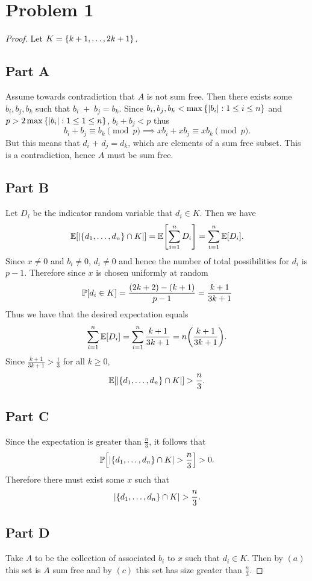 \documentclass{eeleyes}
\begin{document}
\section*{Problem 1}
\begin{proof}
    Let $K = \qty{k+1, \ldots, 2k+1}$.

    \subsection*{Part A}
    Assume towards contradiction that $A$ is not sum free. Then there exists some $b_i, b_j, b_k$ such that $b_i \;+ \;b_j = b_k$. Since $b_i, b_j, b_k < \max\qty{\qty|b_i| : 1 \leq i \leq n}$ and $p > 2 \max\qty{\qty|b_i| : 1 \leq 1 \leq n}$, $b_i + b_j < p$ thus
    \[
        b_i + b_j \equiv b_k \pmod{p} \implies x b_i + x b_j \equiv x b_k \pmod{p}
    .\]
    But this means that $d_i \hspace{1pt}+\hspace{1pt} d_j = d_k$, which are elements of a sum free subset. This is a contradiction, hence $A$ must be sum free.

    \subsection*{Part B}
    Let $D_i$ be the indicator random variable that $d_i \in K$. Then we have
    \[
        \mathbb{E}\qty[\qty|\qty{d_1, \ldots, d_n} \cap K|] = \mathbb{E}\qty[\sum_{i = 1}^n D_i] = \sum_{i = 1}^n \mathbb{E}\qty[D_i]
    .\]
    Since $x \neq 0$ and $b_i \neq 0$, $d_i \neq 0$ and hence the number of total possibilities for $d_i$ is $p - 1$. Therefore since $x$ is chosen uniformly at random
    \[
        \mathbb{P}\qty[d_i \in K] = \frac{(2k + 2) - (k+1)}{p - 1} = \frac{k+1}{3k+1}
    \]
    Thus we have that the desired expectation equals
    \[
        \sum_{i=1}^n \mathbb{E}\qty[D_i] = \sum_{i=1}^n \frac{k+1}{3k+1} = n \qty(\frac{k+1}{3k+1})
    .\]
    Since $\frac{k+1}{3k+1} > \frac{1}{3}$ for all $k \geq 0$,
    \[
        \mathbb{E}\qty[\qty|\qty{d_1, \ldots, d_n} \cap K|] > \frac{n}{3}
    .\]

    \subsection*{Part C}
    Since the expectation is greater than $\frac{n}{3}$, it follows that
    \[
        \mathbb{P}\qty[\qty|\qty{d_1, \ldots, d_n} \cap K| > \frac{n}{3}] > 0
    .\]
    Therefore there must exist some $x$ such that
    \[
        \qty|\qty{d_1, \ldots, d_n} \cap K| > \frac{n}{3}
    .\]

    \subsection*{Part D}
    Take $A$ to be the collection of associated $b_i$ to $x$ such that $d_i \in K$. Then by $(a)$ this set is $A$ sum free and by $(c)$ this set has size greater than $\frac{n}{3}$. \qedhere

\end{proof}
\end{document}
